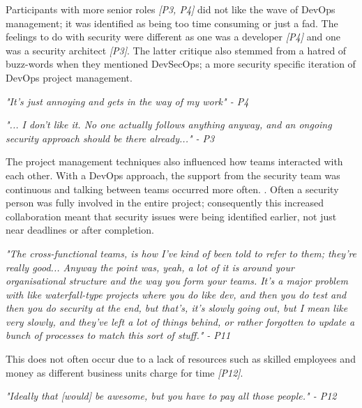 \newline
\par 
Participants with more senior roles \textit{[P3, P4]} did not like the wave of DevOps management; it was identified as being too time consuming or just a fad. The feelings to do with security were different as one was a developer \textit{[P4]} and one was a security architect \textit{[P3]}. The latter critique also stemmed from a hatred of buzz-words when they mentioned DevSecOps; a more security specific iteration of DevOps project management.
\newline
\par \textit{"It's just annoying and gets in the way of my work" - P4}
\newline
\par \textit{"... I don't like it. No one actually follows anything anyway, and an ongoing security approach should be there already..." - P3}
\newline
\par 
The project management techniques also influenced how teams interacted with each other. With a DevOps approach, the support from the security team was continuous and talking between teams occurred more often. . Often a security person was fully involved in the entire project; consequently this increased collaboration meant that security issues were being identified earlier, not just near deadlines or after completion. 
\newline
\par 
\textit{"The cross-functional teams, is how I've kind of been told to refer to them; they're really good... Anyway the point was, yeah, a lot of it is around your organisational structure and the way you form your teams. It's a major problem with like waterfall-type projects where you do like dev, and then you do test and then you do security at the end, but that's, it's slowly going out, but I mean like very slowly, and they've left a lot of things behind, or rather forgotten to update a bunch of processes to match this sort of stuff." - P11}
\newline
\par
This does not often occur due to a lack of resources such as skilled employees and money as different business units charge for time \textit{[P12]}. 
\newline
\par
\textit{"Ideally that [would] be awesome, but you have to pay all those people." - P12 }

